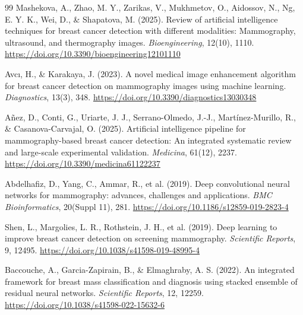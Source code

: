 \begin{thebibliography}{99}
    Mashekova, A., Zhao, M. Y., Zarikas, V., Mukhmetov, O., Aidossov, N., Ng, E. Y. K., Wei, D., \& Shapatova, M. (2025).
    Review of artificial intelligence techniques for breast cancer detection with different modalities:
    Mammography, ultrasound, and thermography images. \textit{Bioengineering}, 12(10), 1110.
    \url{https://doi.org/10.3390/bioengineering12101110}

    Avcı, H., \& Karakaya, J. (2023). A novel medical image enhancement algorithm for breast cancer
    detection on mammography images using machine learning. \textit{Diagnostics}, 13(3), 348.
    \url{https://doi.org/10.3390/diagnostics13030348}

    Añez, D., Conti, G., Uriarte, J. J., Serrano-Olmedo, J.-J., Martínez-Murillo, R., \& Casanova-Carvajal, O. (2025).
    Artificial intelligence pipeline for mammography-based breast cancer detection: An integrated systematic review and
    large-scale experimental validation. \textit{Medicina}, 61(12), 2237.
    \url{https://doi.org/10.3390/medicina61122237}

    Abdelhafiz, D., Yang, C., Ammar, R., et al. (2019). Deep convolutional neural networks for mammography:
    advances, challenges and applications. \textit{BMC Bioinformatics}, 20(Suppl 11), 281.
    \url{https://doi.org/10.1186/s12859-019-2823-4}

    Shen, L., Margolies, L. R., Rothstein, J. H., et al. (2019). Deep learning to improve breast cancer
    detection on screening mammography. \textit{Scientific Reports}, 9, 12495.
    \url{https://doi.org/10.1038/s41598-019-48995-4}

    Baccouche, A., Garcia-Zapirain, B., \& Elmaghraby, A. S. (2022). An integrated framework for breast mass
    classification and diagnosis using stacked ensemble of residual neural networks. \textit{Scientific Reports}, 12, 12259.
    \url{https://doi.org/10.1038/s41598-022-15632-6}


\end{thebibliography}
